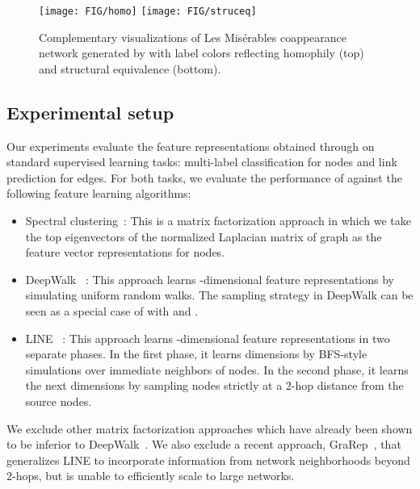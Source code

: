 \begin{figure}[t]
	\centering
	\texttt{[image: FIG/homo]}
	\vspace{-0.2cm}
	\texttt{[image: FIG/struceq]}
	\caption{Complementary visualizations of Les Mis\'{e}rables coappearance network generated by \nodevec with label colors reflecting homophily (top) and structural equivalence (bottom).}\label{fig:equi}
	\vspace{-0.4cm}
\end{figure}


\subsection{Experimental setup}

Our experiments evaluate the feature representations obtained through \nodevec on standard supervised learning tasks: multi-label classification for nodes and link prediction for edges. For both tasks, we evaluate the performance of \nodevec against the following feature learning algorithms:

\begin{itemize}[noitemsep,nolistsep]
	\item Spectral clustering~\cite{spectral}: This is a matrix factorization approach in which we take the top  eigenvectors of the normalized Laplacian matrix of graph  as the feature vector representations for nodes.
	\item DeepWalk 
~\cite{deepwalk}: This approach learns -dimensional feature representations by simulating uniform random walks. The sampling strategy in DeepWalk can be seen as a special case of \nodevec with  and .
	\item LINE 
~\cite{line}: This approach learns -dimensional feature representations in two separate phases. In the first phase, it learns  dimensions by BFS-style simulations over immediate neighbors of nodes. In the second phase, it learns the next  dimensions by sampling nodes strictly at a 2-hop distance from the source nodes. 
\end{itemize}

We exclude other matrix factorization approaches which have already been shown to be inferior to DeepWalk~\cite{deepwalk}. We also exclude a recent approach, GraRep~\cite{grarep}, that generalizes LINE to incorporate information from network neighborhoods beyond 2-hops, but is unable to efficiently scale to large networks. 


